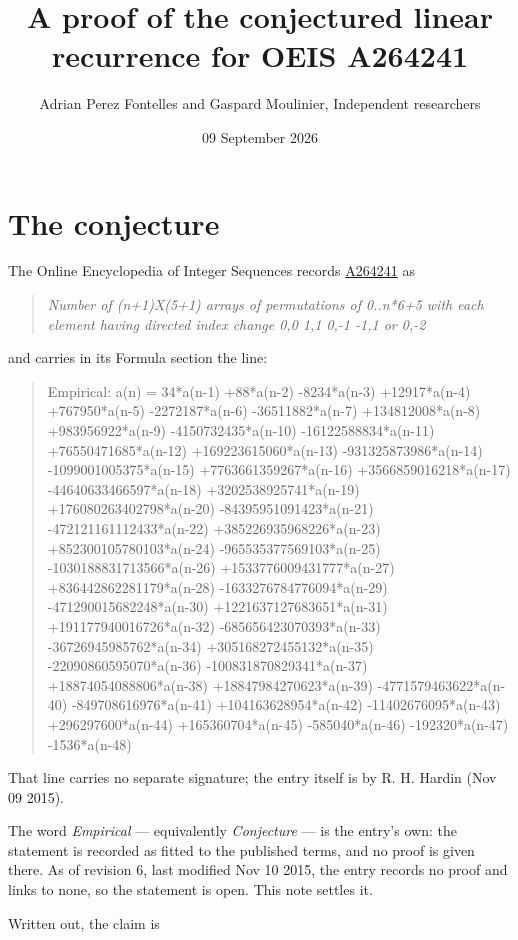 \documentclass[11pt]{article}
\title{A proof of the conjectured linear recurrence for OEIS A264241}
\author{Adrian Perez Fontelles and Gaspard Moulinier, Independent researchers}
\date{09 September 2026}
\theoremstyle{definition}
\begin{document}
\maketitle
\section{The conjecture}

The Online Encyclopedia of Integer Sequences records \href{https://oeis.org/A264241}{A264241} as

\begin{quote}\itshape Number of (n+1)X(5+1) arrays of permutations of 0..n*6+5 with each element having directed index change 0,0 1,1 0,-1 -1,1 or 0,-2\end{quote}

and carries in its Formula section the line:

\begin{quote}\ttfamily Empirical: a(n) = 34*a(n-1) +88*a(n-2) -8234*a(n-3) +12917*a(n-4) +767950*a(n-5) -2272187*a(n-6) -36511882*a(n-7) +134812008*a(n-8) +983956922*a(n-9) -4150732435*a(n-10) -16122588834*a(n-11) +76550471685*a(n-12) +169223615060*a(n-13) -931325873986*a(n-14) -1099001005375*a(n-15) +7763661359267*a(n-16) +3566859016218*a(n-17) -44640633466597*a(n-18) +3202538925741*a(n-19) +176080263402798*a(n-20) -84395951091423*a(n-21) -472121161112433*a(n-22) +385226935968226*a(n-23) +852300105780103*a(n-24) -965535377569103*a(n-25) -1030188831713566*a(n-26) +1533776009431777*a(n-27) +836442862281179*a(n-28) -1633276784776094*a(n-29) -471290015682248*a(n-30) +1221637127683651*a(n-31) +191177940016726*a(n-32) -685656423070393*a(n-33) -36726945985762*a(n-34) +305168272455132*a(n-35) -22090860595070*a(n-36) -100831870829341*a(n-37) +18874054088806*a(n-38) +18847984270623*a(n-39) -4771579463622*a(n-40) -849708616976*a(n-41) +104163628954*a(n-42) -11402676095*a(n-43) +296297600*a(n-44) +165360704*a(n-45) -585040*a(n-46) -192320*a(n-47) -1536*a(n-48)\end{quote}

That line carries no separate signature; the entry itself is by R. H. Hardin (Nov 09 2015).

The word {\itshape Empirical} --- equivalently {\itshape Conjecture} --- is the entry's own: the statement is recorded as fitted to the published terms, and no proof is given there. As of revision 6, last modified Nov 10 2015, the entry records no proof and links to none, so the statement is open. This note settles it.

Written out, the claim is
\end{document}
